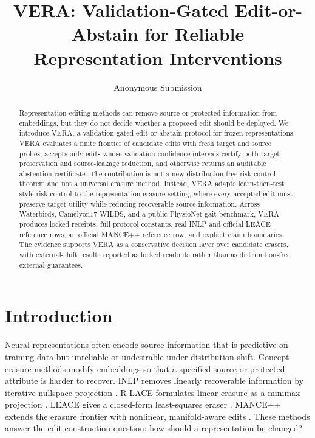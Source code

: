 \documentclass[letterpaper]{article}
\title{VERA: Validation-Gated Edit-or-Abstain for Reliable Representation Interventions}
\author{Anonymous Submission}
\begin{document}
\maketitle

\begin{abstract}
Representation editing methods can remove source or protected information from
embeddings, but they do not decide whether a proposed edit should be deployed.
We introduce VERA, a validation-gated edit-or-abstain protocol for frozen
representations. VERA evaluates a finite frontier of candidate edits with fresh
target and source probes, accepts only edits whose validation confidence
intervals certify both target preservation and source-leakage reduction, and
otherwise returns an auditable abstention certificate. The contribution is not
a new distribution-free risk-control theorem and not a universal erasure
method. Instead, VERA adapts learn-then-test style risk control to the
representation-erasure setting, where every accepted edit must preserve target
utility while reducing recoverable source information. Across Waterbirds,
Camelyon17-WILDS, and a public PhysioNet gait benchmark, VERA produces locked
receipts, full protocol constants, real INLP and official LEACE reference rows,
an official MANCE++ reference row, and explicit claim boundaries. The evidence
supports VERA as a conservative decision layer over candidate erasers, with
external-shift results reported as locked readouts rather than as
distribution-free external guarantees.
\end{abstract}

\section{Introduction}

Neural representations often encode source information that is predictive on
training data but unreliable or undesirable under distribution shift. Concept
erasure methods modify embeddings so that a specified source or protected
attribute is harder to recover. INLP removes linearly recoverable information
by iterative nullspace projection \citep{ravfogel2020inlp}. R-LACE formulates
linear erasure as a minimax projection \citep{ravfogel2022lace}. LEACE gives a
closed-form least-squares eraser \citep{belrose2023leace}. MANCE++ extends
the erasure frontier with nonlinear, manifold-aware edits
\citep{avitan2026mance}. These methods answer the edit-construction question:
how should a representation be changed?
\end{document}
